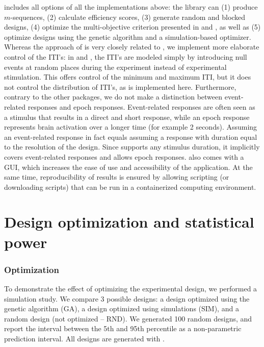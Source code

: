 \documentclass[article]{jss}
\begin{document}
 includes all options of all the implementations
above: the library can (1) produce $m$-sequences, (2) calculate
efficiency scores, (3) generate random and blocked designs, (4)
optimize the multi-objective criterion presented in
\citet{Wager2003-hy} and \citet{Kao2009-yo}, as well as (5) optimize
designs using the genetic algorithm and a simulation-based optimizer.
Whereas the approach of  is very closely related to
, we implement more elaborate control of the ITI's: in
 and , the ITI's are modeled
simply by introducing null events at random places during the
experiment instead of experimental stimulation.  This offers control
of the minimum and maximum ITI, but it does not control the
distribution of ITI's, as is implemented here.  Furthermore, contrary
to the other packages, we do not make a distinction between
event-related responses and epoch responses.  Event-related responses
are often seen as a stimulus that results in a direct and short
response, while an epoch response represents brain activation over a
longer time (for example 2 seconds).  Assuming an event-related
response in fact equals assuming a response with duration equal to the
resolution of the design.  Since  supports any
stimulus duration, it implicitly covers event-related responses and
allows epoch responses.   also comes with a GUI,
which increases the ease of use and accessibility of the application.
At the same time, reproducibility of results is ensured by allowing
scripting (or downloading scripts) that can be run in a containerized
computing environment.


\section{Design optimization and statistical power}\label{sec:design-optim-stat}

\subsubsection{Optimization}

To demonstrate the effect of optimizing the experimental design, we
performed a simulation study.  We compare 3 possible designs: a design
optimized using the genetic algorithm (GA), a design optimized using
simulations (SIM), and a random design (not optimized -- RND).  We
generated 100 random designs, and report the interval between the 5th
and 95th percentile as a non-parametric prediction interval.  All
designs are generated with .
\end{document}
